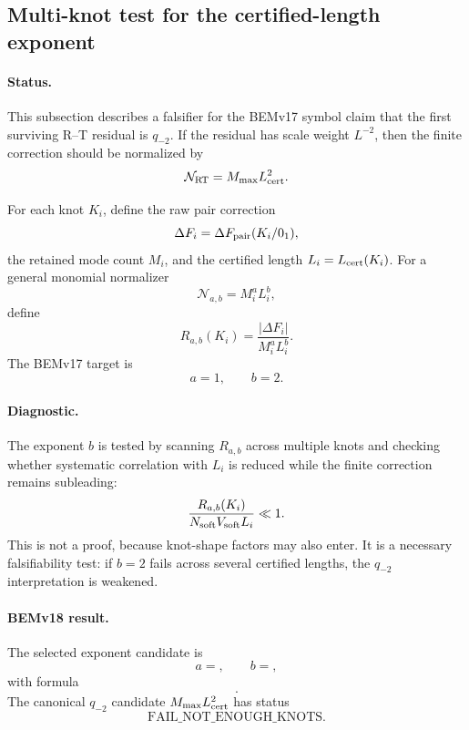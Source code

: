 
\subsection{Multi-knot test for the certified-length exponent}

\paragraph{Status.}
This subsection describes a falsifier for the BEMv17 symbol claim that the
first surviving R--T residual is \(q_{-2}\).  If the residual has scale weight
\(L^{-2}\), then the finite correction should be normalized by
\[
\mathcal N_{\rm RT}=M_{\max}L_{\rm cert}^{2}.
\]

For each knot \(K_i\), define the raw pair correction
\[
\Delta F_i=\Delta F_{\rm pair}(K_i/0_1),
\]
the retained mode count \(M_i\), and the certified length \(L_i=L_{\rm cert}(K_i)\).
For a general monomial normalizer
\[
\mathcal N_{a,b}=M_i^a L_i^b,
\]
define
\[
R_{a,b}(K_i)=
\frac{|\Delta F_i|}
{M_i^aL_i^b}.
\]
The BEMv17 target is
\[
a=1,\qquad b=2.
\]

\paragraph{Diagnostic.}
The exponent \(b\) is tested by scanning \(R_{a,b}\) across multiple knots and
checking whether systematic correlation with \(L_i\) is reduced while the
finite correction remains subleading:
\[
\frac{R_{a,b}(K_i)}
{N_{\rm soft}V_{\rm soft}L_i}
\ll 1.
\]
This is not a proof, because knot-shape factors may also enter.  It is a
necessary falsifiability test: if \(b=2\) fails across several certified
lengths, the \(q_{-2}\) interpretation is weakened.

\paragraph{BEMv18 result.}
The selected exponent candidate is
\[
a=,\qquad b=,
\]
with formula
\[
.
\]
The canonical \(q_{-2}\) candidate \(M_{\max}L_{\rm cert}^{2}\) has status
\[
\boxed{\text{FAIL_NOT_ENOUGH_KNOTS}}.
\]

